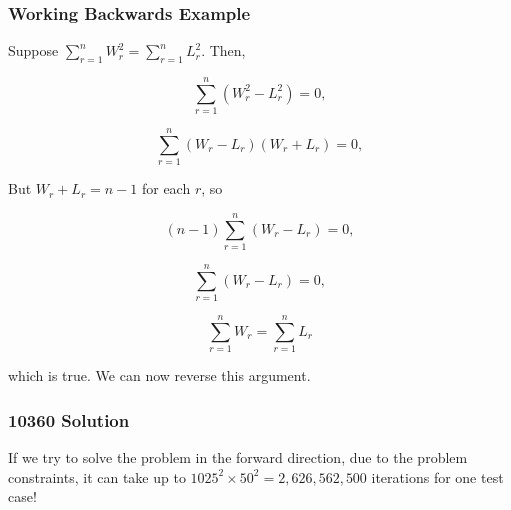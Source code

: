 \documentclass{beamer}
\newcommand{\uvalink}[2]{UVa Online Judge (http://uva.onlinejudge.org)
  problem number \href{#2}{\textcolor{blue}{#1}.}}
\newcounter{exo}
\newcommand{\exo}{
  \addtocounter{exo}{1}
  Exercice \arabic{exo}
}
\begin{document}
\begin{frame}%
\frametitle{Working Backwards Example}

\scriptsize

Suppose $\sum_{r = 1}^{n} W_r^2 = \sum_{r = 1}^{n} L_r^2$. Then,


$$
\sum_{r = 1}^{n} (W_r^2 - L_r^2) = 0,
$$


$$
\sum_{r = 1}^{n} (W_r - L_r)(W_r + L_r) = 0,
$$


But $W_r + L_r = n - 1$ for each $r$, so

$$
(n - 1)\sum_{r = 1}^{n} (W_r - L_r) = 0,
$$

$$
\sum_{r = 1}^{n} (W_r - L_r) = 0,
$$

$$
\sum_{r = 1}^{n} W_r = \sum_{r = 1}^{n} L_r
$$

which is true. We can now reverse this argument.

\end{frame}


\ifanswers

\begin{frame}
\frametitle{10360 Solution}

\footnotesize

If we try to solve the problem in the forward direction,
due to the problem constraints, it can take up to $1025^2 \times 50^2 = 2,626,562,500$ iterations for one
test case!



\end{frame}
\end{document}
